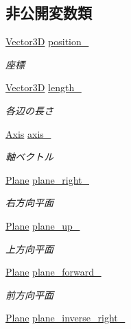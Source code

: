 \subsection*{非公開変数類}
\begin{DoxyCompactItemize}
\item 
\mbox{\hyperlink{class_vector3_d}{Vector3D}} \mbox{\hyperlink{class_o_b_b_ab05a884fc030d7a3cf7b355880d9194c}{position\+\_\+}}
\begin{DoxyCompactList}\small\item\em 座標 \end{DoxyCompactList}\item 
\mbox{\hyperlink{class_vector3_d}{Vector3D}} \mbox{\hyperlink{class_o_b_b_a04dc4d7036d26215f9c33a7cad633947}{length\+\_\+}}
\begin{DoxyCompactList}\small\item\em 各辺の長さ \end{DoxyCompactList}\item 
\mbox{\hyperlink{class_axis}{Axis}} \mbox{\hyperlink{class_o_b_b_ab8d2349b189dd942a55e49a61fc10809}{axis\+\_\+}}
\begin{DoxyCompactList}\small\item\em 軸ベクトル \end{DoxyCompactList}\item 
\mbox{\hyperlink{class_plane}{Plane}} \mbox{\hyperlink{class_o_b_b_a349ccbb93fc24f5e43761848550143eb}{plane\+\_\+right\+\_\+}}
\begin{DoxyCompactList}\small\item\em 右方向平面 \end{DoxyCompactList}\item 
\mbox{\hyperlink{class_plane}{Plane}} \mbox{\hyperlink{class_o_b_b_a0105639f79e695f0510b2b097df78b18}{plane\+\_\+up\+\_\+}}
\begin{DoxyCompactList}\small\item\em 上方向平面 \end{DoxyCompactList}\item 
\mbox{\hyperlink{class_plane}{Plane}} \mbox{\hyperlink{class_o_b_b_a6fe78664c499603f588bd095938593fe}{plane\+\_\+forward\+\_\+}}
\begin{DoxyCompactList}\small\item\em 前方向平面 \end{DoxyCompactList}\item 
\mbox{\hyperlink{class_plane}{Plane}} \mbox{\hyperlink{class_o_b_b_ad9e12a6f33e83e29f1cbe440dbcc07cb}{plane\+\_\+inverse\+\_\+right\+\_\+}}

\end{DoxyCompactItemize}
